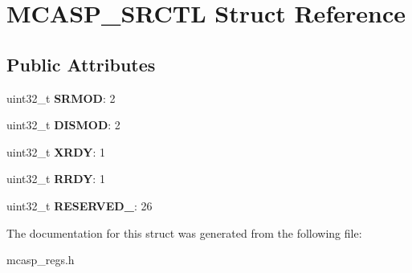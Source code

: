 \hypertarget{structMCASP__SRCTL}{\section{M\-C\-A\-S\-P\-\_\-\-S\-R\-C\-T\-L Struct Reference}
\label{structMCASP__SRCTL}
}
\subsection*{Public Attributes}
\begin{DoxyCompactItemize}
\item 
\hypertarget{structMCASP__SRCTL_a6595f46584fa30682c5eb8ae3904282a}{uint32\-\_\-t {\bfseries S\-R\-M\-O\-D}\-: 2}\label{structMCASP__SRCTL_a6595f46584fa30682c5eb8ae3904282a}

\item 
\hypertarget{structMCASP__SRCTL_a99203c601feed6abd2d8e595efbfcb37}{uint32\-\_\-t {\bfseries D\-I\-S\-M\-O\-D}\-: 2}\label{structMCASP__SRCTL_a99203c601feed6abd2d8e595efbfcb37}

\item 
\hypertarget{structMCASP__SRCTL_abb8901b50269f35d2ab71a56cf2a30f9}{uint32\-\_\-t {\bfseries X\-R\-D\-Y}\-: 1}\label{structMCASP__SRCTL_abb8901b50269f35d2ab71a56cf2a30f9}

\item 
\hypertarget{structMCASP__SRCTL_ac88ae3577ca7e5b8e4e77a1d3a3441cf}{uint32\-\_\-t {\bfseries R\-R\-D\-Y}\-: 1}\label{structMCASP__SRCTL_ac88ae3577ca7e5b8e4e77a1d3a3441cf}

\item 
\hypertarget{structMCASP__SRCTL_a580582dd7da26965d454a95219d1b910}{uint32\-\_\-t {\bfseries R\-E\-S\-E\-R\-V\-E\-D\-\_}\-: 26}\label{structMCASP__SRCTL_a580582dd7da26965d454a95219d1b910}

\end{DoxyCompactItemize}


The documentation for this struct was generated from the following file\-:\begin{DoxyCompactItemize}
\item 
mcasp\-\_\-regs.\-h\end{DoxyCompactItemize}
